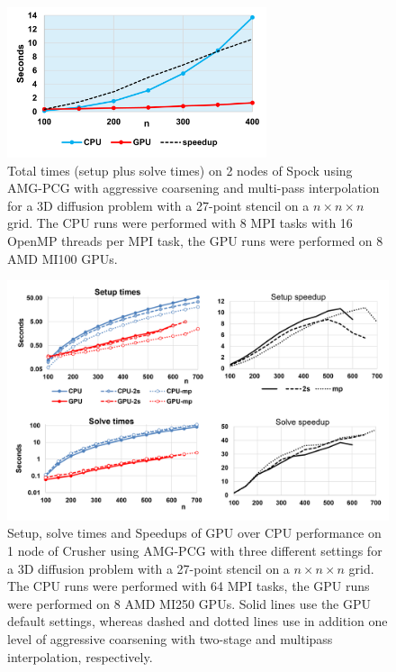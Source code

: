 \begin{figure}[bth]
\centering
	\includegraphics[width=3in]{projects/2.3.3-MathLibs/2.3.3.12-SUNDIALS-hypre/spock-AMG-PCG.png}
	\caption{\label{fig:Spock-AMG} Total times (setup plus solve times) on 2 nodes of Spock using AMG-PCG with aggressive coarsening and multi-pass interpolation for a 3D diffusion problem with a 27-point stencil on a $n \times n \times n$ grid. The CPU runs were performed with 8 MPI tasks with 16 OpenMP threads per MPI task, the GPU runs were performed on 8 AMD MI100 GPUs.}

\end{figure}

\begin{figure}[bth]
\centering
	\includegraphics[width=5in]{projects/2.3.3-MathLibs/2.3.3.12-SUNDIALS-hypre/crusher-AMG-PCG.png}
	\caption{\label{fig:crusher-AMG} Setup, solve times and Speedups of GPU over CPU performance on 1 node of Crusher using AMG-PCG with three different settings for a 3D diffusion problem with a 27-point stencil on a $n \times n \times n$ grid. The CPU runs were performed with 64 MPI tasks, the GPU runs were performed on 8 AMD MI250 GPUs. Solid lines use the GPU default settings, whereas dashed and dotted lines use in addition one level of aggressive coarsening with two-stage and multipass interpolation, respectively.}

\end{figure}

